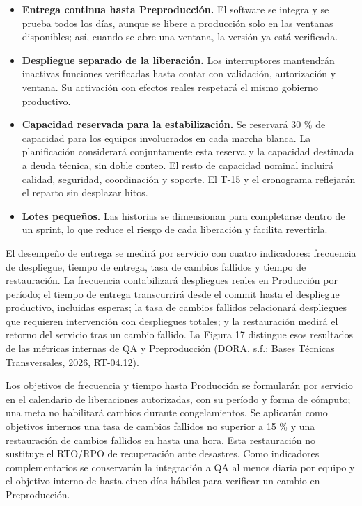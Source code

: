 \documentclass[11pt]{article}
\begin{document}
\begin{itemize}
\item
  \textbf{Entrega continua hasta Preproducción.} El software se integra
  y se prueba todos los días, aunque se libere a producción solo en las
  ventanas disponibles; así, cuando se abre una ventana, la versión ya
  está verificada.
\item
  \textbf{Despliegue separado de la liberación.} Los interruptores
  mantendrán inactivas funciones verificadas hasta contar con
  validación, autorización y ventana. Su activación con efectos reales
  respetará el mismo gobierno productivo.
\item
  \textbf{Capacidad reservada para la estabilización.} Se reservará 30
  \% de capacidad para los equipos involucrados en cada marcha blanca.
  La planificación considerará conjuntamente esta reserva y la capacidad
  destinada a deuda técnica, sin doble conteo. El resto de capacidad
  nominal incluirá calidad, seguridad, coordinación y soporte. El T-15 y
  el cronograma reflejarán el reparto sin desplazar hitos.
\item
  \textbf{Lotes pequeños.} Las historias se dimensionan para completarse
  dentro de un sprint, lo que reduce el riesgo de cada liberación y
  facilita revertirla.
\end{itemize}

El desempeño de entrega se medirá por servicio con cuatro indicadores:
frecuencia de despliegue, tiempo de entrega, tasa de cambios fallidos y
tiempo de restauración. La frecuencia contabilizará despliegues reales
en Producción por período; el tiempo de entrega transcurrirá desde el
commit hasta el despliegue productivo, incluidas esperas; la tasa de
cambios fallidos relacionará despliegues que requieren intervención con
despliegues totales; y la restauración medirá el retorno del servicio
tras un cambio fallido. La Figura 17 distingue esos resultados de las
métricas internas de QA y Preproducción (DORA, s.f.; Bases Técnicas
Transversales, 2026, RT-04.12).

Los objetivos de frecuencia y tiempo hasta Producción se formularán por
servicio en el calendario de liberaciones autorizadas, con su período y
forma de cómputo; una meta no habilitará cambios durante congelamientos.
Se aplicarán como objetivos internos una tasa de cambios fallidos no
superior a 15 \% y una restauración de cambios fallidos en hasta una
hora. Esta restauración no sustituye el RTO/RPO de recuperación ante
desastres. Como indicadores complementarios se conservarán la
integración a QA al menos diaria por equipo y el objetivo interno de
hasta cinco días hábiles para verificar un cambio en Preproducción.
\end{document}
